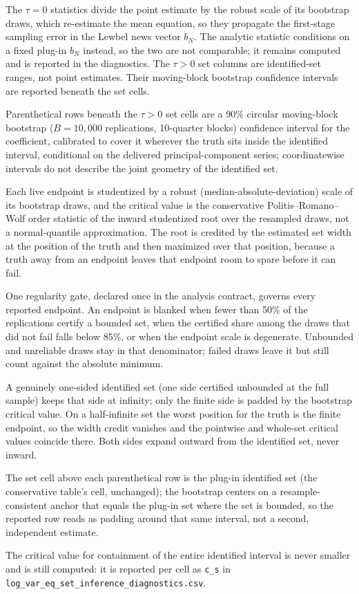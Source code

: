 \documentclass[11pt]{article}
\begin{document}
\begin{table}[!htbp]
\begin{threeparttable}
\begin{tablenotes}[flushleft]
\item The $\tau{=}0$ statistics divide the point estimate by the robust scale of its bootstrap draws, which re-estimate the mean equation, so they propagate the first-stage sampling error in the Lewbel news vector $b_N$. The analytic statistic conditions on a fixed plug-in $b_N$ instead, so the two are not comparable; it remains computed and is reported in the diagnostics. The $\tau{>}0$ set columns are identified-set ranges, not point estimates. Their moving-block bootstrap confidence intervals are reported beneath the set cells.
\item Parenthetical rows beneath the $\tau{>}0$ set cells are a 90\% circular moving-block bootstrap ($B=10{,}000$ replications, 10-quarter blocks) confidence interval for the coefficient, calibrated to cover it wherever the truth sits inside the identified interval, conditional on the delivered principal-component series; coordinatewise intervals do not describe the joint geometry of the identified set.
\item Each live endpoint is studentized by a robust (median-absolute-deviation) scale of its bootstrap draws, and the critical value is the conservative Politis--Romano--Wolf order statistic of the inward studentized root over the resampled draws, not a normal-quantile approximation. The root is credited by the estimated set width at the position of the truth and then maximized over that position, because a truth away from an endpoint leaves that endpoint room to spare before it can fail.
\item One regularity gate, declared once in the analysis contract, governs every reported endpoint. An endpoint is blanked when fewer than 50\% of the replications certify a bounded set, when the certified share among the draws that did not fail falls below 85\%, or when the endpoint scale is degenerate. Unbounded and unreliable draws stay in that denominator; failed draws leave it but still count against the absolute minimum.
\item A genuinely one-sided identified set (one side certified unbounded at the full sample) keeps that side at infinity; only the finite side is padded by the bootstrap critical value. On a half-infinite set the worst position for the truth is the finite endpoint, so the width credit vanishes and the pointwise and whole-set critical values coincide there. Both sides expand outward from the identified set, never inward.
\item The set cell above each parenthetical row is the plug-in identified set (the conservative table's cell, unchanged); the bootstrap centers on a resample-consistent anchor that equals the plug-in set where the set is bounded, so the reported row reads as padding around that same interval, not a second, independent estimate.
\item The critical value for containment of the entire identified interval is never smaller and is still computed: it is reported per cell as \texttt{c\_s} in \texttt{log\_var\_eq\_set\_inference\_diagnostics.csv}.
\end{tablenotes}
\end{threeparttable}
\end{table}
\end{document}
